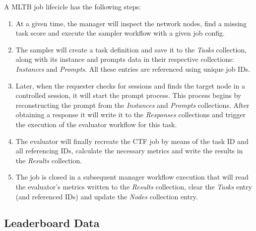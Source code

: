A \gls{MLTB} job lifecicle has the following steps:
\begin{enumerate}
    \item At a given time, the manager will inspect the network nodes, find a missing task score and execute the sampler workflow with a given job config.
    \item The sampler will create a task definition and save it to the \emph{Tasks} collection, along with its instance and prompts data in their respective collections: \emph{Instances} and \emph{Prompts}. All these entries are referenced using unique job IDs. 
    \item Later, when the requester checks for sessions and finds the target node in a controlled session, it will start the prompt process. This process begins by reconstructing the prompt from the \emph{Instances} and \emph{Prompts} collections. After obtaining a response it will write it to the \emph{Responses} collections and trigger the execution of the evaluator workflow for this task.
    \item The evaluator will finally recreate the \gls{CTF} job by means of the task ID and all referencing IDs, calculate the necessary metrics and write the results in the \emph{Results} collection.
    \item The job is closed in a subsequent manager workflow execution that will read the evaluator's metrics written to the \emph{Results} collection, clear the \emph{Tasks} entry (and referenced IDs) and update the \emph{Nodes} collection entry. 
\end{enumerate}


\subsection{Leaderboard Data}

